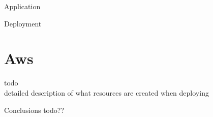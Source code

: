 \begin{mainmatter}
\begin{chapter}{Application}
    \end{chapter}


    \begin{chapter}{Deployment}
        \label{chap:deployment}

        \section{Aws}
        todo\\
        detailed description of what resources are created when deploying

    \end{chapter}


    \begin{chapter}{Conclusions}
        todo??
    \end{chapter}

\end{mainmatter}